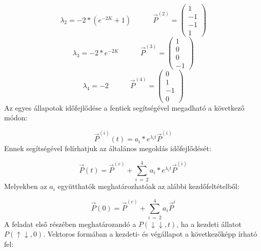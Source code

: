 \begin{equation} \label{eq:26}
    \lambda_{2}
    =
    -2 * \left(e^{-2K} + 1 \right)
    \quad \quad \quad
    \vec{P}^{\left( 2 \right)}
    =
    \begin{pmatrix}
        1 \\
        -1 \\
        -1 \\
        1
    \end{pmatrix}
\end{equation}
\begin{equation} \label{eq:27}
    \lambda_{3}
    =
    -2 * e^{-2K}
    \quad \quad \quad
    \vec{P}^{\left( 3 \right)}
    =
    \begin{pmatrix}
        1 \\
        0 \\
        0 \\
        -1
    \end{pmatrix}
\end{equation}
\begin{equation} \label{eq:28}
    \lambda_{4}
    =
    -2
    \quad \quad \quad
    \vec{P}^{\left( 4 \right)}
    =
    \begin{pmatrix}
        0 \\
        1 \\
        -1 \\
        0
    \end{pmatrix}
\end{equation}
Az egyes állapotok időfejlődése a fentiek segítségével megadható a következő módon:

\begin{equation} \label{eq:29}
    \vec{P}^{\left ( i \right)} \left ( t \right)
    =
    a_{i} * e^{\lambda_{i} t} \vec{P}^{\left ( i \right)}
\end{equation}
Ennek segítségével felírhatjuk az általános megoldás időfejlődését:

\begin{equation} \label{eq:30}
    \vec{P} \left ( t \right)
    =
    \vec{P}^{\left ( e \right)}
    +
    \sum_{i\ =\ 2}^{4} a_{i} * e^{\lambda_{i} t} \vec{P}^{\left ( i \right)}
\end{equation}
Melyekben az $a_{i}$ együtthatók meghatározhatóak az alábbi kezdőfeltételből:

\begin{equation} \label{eq:31}
    \vec{P} \left(0 \right)
    =
    \vec{P}^{\left ( e \right)}
    +
    \sum_{i\ =\ 2}^{4} a_{i} \vec{P}^{i}
\end{equation}
A feladat első részében meghatározandó a $P \left( \downarrow \downarrow, t \right)$, ha a kezdeti állatot $P \left( \uparrow \downarrow, 0 \right)$. Vektoros formában a kezdeti- és végállapot a következőképp írható fel:


